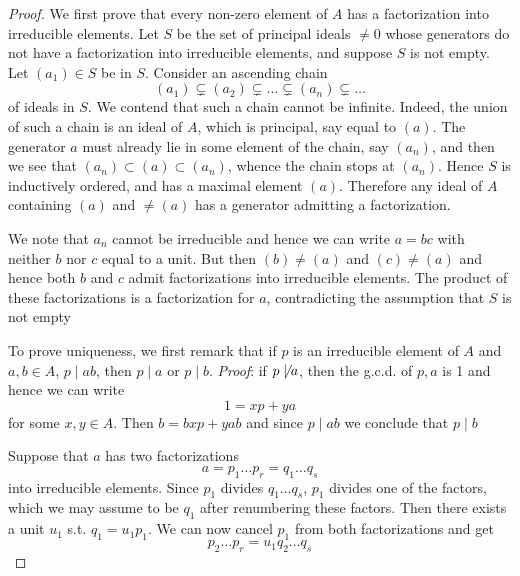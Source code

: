 \documentclass[11pt]{article}
\begin{document}
\begin{proof}
We first prove that every non-zero element of \(A\) has a factorization into irreducible
elements. Let \(S\) be the set of principal ideals \(\neq 0\) whose generators do not have a
factorization into irreducible elements, and suppose \(S\) is not empty. Let \((a_1)\in S\)  be
in \(S\). Consider an ascending chain
\begin{equation*}
(a_1)\subsetneq(a_2)\subsetneq\dots\subsetneq(a_n)\subsetneq\dots
\end{equation*}
of ideals in \(S\). We contend that such a chain cannot be infinite. Indeed, the union of such a
chain is an ideal of \(A\), which is principal, say equal to \((a)\). The generator \(a\) must
already lie in some element of the chain, say \((a_n)\), and then we see
that \((a_n)\subset(a)\subset(a_n)\), whence the chain stops at \((a_n)\). Hence \(S\)  is inductively
ordered, and has a maximal element \((a)\). Therefore any ideal of \(A\) containing \((a)\)
and \(\neq(a)\) has a generator admitting a factorization.

We note that \(a_n\) cannot be irreducible and hence we can write \(a=bc\) with neither \(b\)
nor \(c\) equal to a unit. But then \((b)\neq(a)\) and \((c)\neq(a)\) and hence both \(b\) and \(c\)
admit factorizations into irreducible elements. The product of these factorizations is a
factorization for \(a\), contradicting the assumption that \(S\) is not empty

To prove uniqueness, we first remark that if \(p\) is an irreducible element of \(A\)
and \(a,b\in A\), \(p\mid ab\), then \(p\mid a\) or \(p\mid b\). \emph{Proof}: if \(p\not\mid a\), then the g.c.d.
of \(p,a\) is 1 and hence we can write
\begin{equation*}
1=xp+ya
\end{equation*}
for some \(x,y\in A\). Then \(b=bxp+yab\) and since \(p\mid ab\) we conclude that \(p\mid b\)

Suppose that \(a\) has two factorizations
\begin{equation*}
a=p_1\dots p_r=q_1\dots q_s
\end{equation*}
into irreducible elements. Since \(p_1\) divides \(q_1\dots q_s\), \(p_1\) divides one of the factors,
which we may assume to be \(q_1\) after renumbering these factors. Then there exists a unit \(u_1\)
s.t. \(q_1=u_1p_1\). We can now cancel \(p_1\) from both factorizations and get
\begin{equation*}
p_2\dots p_r=u_1q_2\dots q_s
\end{equation*}
\end{proof}
\end{document}
